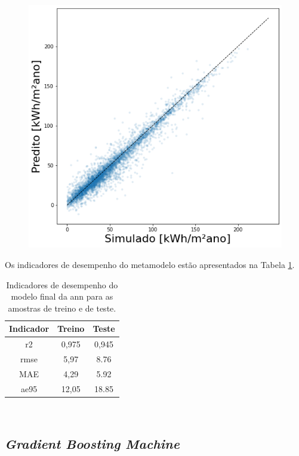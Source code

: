 \documentclass{article}
\begin{document}
\begin{figure}[!htb]
\begin{minipage}{.5\textwidth}
		\includegraphics[width=\linewidth]{scatter_test_ann.png}
	\end{minipage}
\end{figure}

Os indicadores de desempenho do metamodelo estão apresentados na Tabela \ref{table:desempenhoann}.
\begin{table}[!htb]
	\centering
	\caption{Indicadores de desempenho do modelo final da \acrshort{ann} para as amostras de treino e de teste.}
	\label{table:desempenhoann}
	\begin{tabular}{|c |c |c |}
		\hline
		\textbf{Indicador} & \textbf{Treino} & \textbf{Teste} \\
		\hline
		\acrshort{r2} & 0,975 & 0,945 \\
		\hline
		\acrshort{rmse} & 5,97 & 8.76 \\
		\hline
		MAE & 4,29 & 5.92 \\
		\hline
		\acrshort{ae95} & 12,05 & 18.85 \\
		\hline
	\end{tabular}\\
\end{table}

\subsection{\textit{Gradient Boosting Machine}}
\end{document}
